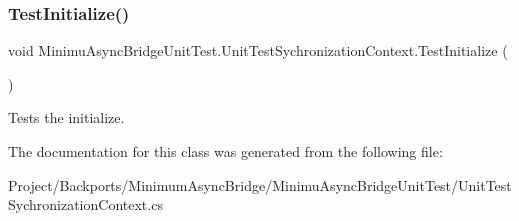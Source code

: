 \subsubsection{\texorpdfstring{Test\+Initialize()}{TestInitialize()}}
{\footnotesize\ttfamily void Minimu\+Async\+Bridge\+Unit\+Test.\+Unit\+Test\+Sychronization\+Context.\+Test\+Initialize (\begin{DoxyParamCaption}{ }\end{DoxyParamCaption})\hspace{0.3cm}{\ttfamily [inline]}}



Tests the initialize. 



The documentation for this class was generated from the following file\+:\begin{DoxyCompactItemize}
\item 
Project/\+Backports/\+Minimum\+Async\+Bridge/\+Minimu\+Async\+Bridge\+Unit\+Test/Unit\+Test\+Sychronization\+Context.\+cs\end{DoxyCompactItemize}
